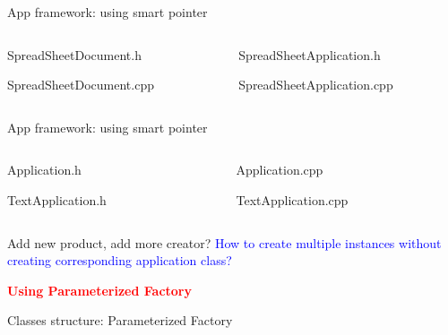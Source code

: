 \documentclass[13pt]{beamer}
\begin{document}
\begin{frame}{App framework: using smart pointer}
\begin{columns}[T]
\begin{column}{.45\textwidth}
\lstset{basicstyle=\tiny,style=myCustomCppStyle}
SpreadSheetDocument.h

SpreadSheetDocument.cpp

\end{column}

\begin{column}{.45\textwidth}
\lstset{basicstyle=\tiny,style=myCustomCppStyle}
SpreadSheetApplication.h

SpreadSheetApplication.cpp

\end{column}
\end{columns}
\end{frame}

\begin{frame}{App framework: using smart pointer}
\begin{columns}[T]
\begin{column}{.45\textwidth}
\lstset{basicstyle=\tiny,style=myCustomCppStyle}
Application.h

TextApplication.h

\end{column}

\begin{column}{.45\textwidth}
\lstset{basicstyle=\tiny,style=myCustomCppStyle}
Application.cpp

TextApplication.cpp

\end{column}
\end{columns}
\end{frame}

\begin{frame}{Add new product, add more creator?}
	\textcolor{blue}{How to create multiple instances without creating corresponding application class?}	
	\begin{center}
	\textcolor{red}{\textbf{Using Parameterized Factory}}
	\end{center}
\end{frame}

\begin{frame}{Classes structure: Parameterized Factory}
\begin{center}
\end{center}
\end{frame}
\end{document}

